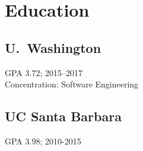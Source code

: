 \section{Education}

\subsection{U.~Washington}
GPA 3.72; 2015--2017 \\
Concentration: Software Engineering
\sectionsep

\subsection{UC Santa Barbara}
GPA 3.98; 2010-2015
\sectionsep
